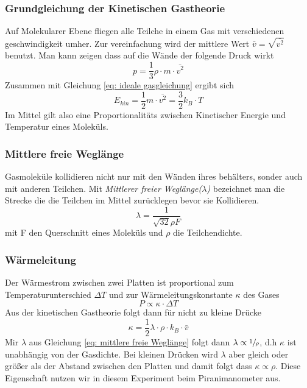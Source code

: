 \documentclass[12pt]{article}
\begin{document}
	\subsubsection{Grundgleichung der Kinetischen Gastheorie}
	Auf Molekularer Ebene fliegen alle Teilche in einem Gas mit verschiedenen geschwindigkeit umher. Zur vereinfachung wird der mittlere Wert $\bar{v}=\sqrt{\bar{v^2}}$ benutzt. Man kann zeigen dass auf die Wände der folgende Druck wirkt
	\begin{equation}
	p= \frac{1}{3}\rho \cdot m \cdot \bar{v^2}
	\end{equation}
	Zusammen mit Gleichung \ref{eq: ideale gasgleichung} ergibt sich
	\begin{equation}
		E_{kin}=\frac{1}{2}m \cdot \bar{v^2} = \frac{3}{2}k_B \cdot T
	\end{equation}
	Im Mittel gilt also eine Proportionalitäts zwischen Kinetischer Energie und Temperatur eines Moleküls.
	\subsubsection{Mittlere freie Weglänge}
	Gasmoleküle kollidieren nicht nur mit den Wänden ihres behälters, sonder auch mit anderen Teilchen. Mit \textit{Mittlerer freier Weglänge($\lambda$)} bezeichnet man die Strecke die die Teilchen im Mittel zurücklegen bevor sie Kollidieren.
	\begin{equation}\label{eq: mittlere freie Weglänge}
		\lambda= \frac{1}{\sqrt{32}\rho F}
	\end{equation}
	mit F den Querschnitt eines Moleküls und $\rho$ die Teilchendichte.
	\subsubsection{Wärmeleitung }
	Der Wärmestrom zwischen zwei Platten ist proportional zum Temperaturunterschied $\Delta T$ und zur Wärmeleitungskonstante $\kappa$ des Gases
	\begin{equation}
	P \propto \kappa \cdot \Delta T
	\end{equation}
	Aus der kinetischen Gastheorie folgt dann für nicht zu kleine Drücke 
	\begin{equation}
		\kappa = \frac{1}{2}\lambda \cdot \rho \cdot k_B \cdot \bar{v}
	\end{equation}
	Mir $\lambda$ aus Gleichung \ref{eq: mittlere freie Weglänge} folgt dann $\lambda\propto \sfrac{1}{\rho} $, d.h $\kappa$ ist unabhängig von der Gasdichte. Bei kleinen Drücken wird $\lambda$ aber gleich oder größer als der Abstand zwischen den Platten und damit folgt dass $\kappa  \propto \rho $. Diese Eigenschaft nutzen wir in diesem Experiment beim Piranimanometer aus.
\end{document}
